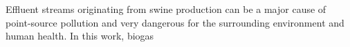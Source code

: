 Effluent streams originating from swine production can be a major cause of point-source pollution and very dangerous for the surrounding environment and human health. In this work, biogas 
